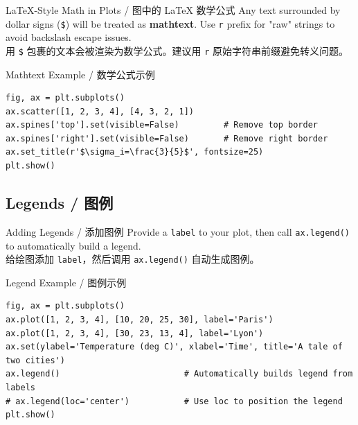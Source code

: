 \documentclass[11pt,a4paper]{report}
\let\oldtexttt\texttt
\renewcommand{\texttt}[1]{\textcolor{mainblue}{\oldtexttt{#1}}}
\begin{document}
\begin{concept}{LaTeX-Style Math in Plots / 图中的 LaTeX 数学公式}
    Any text surrounded by dollar signs (\texttt{\$}) will be treated as \textbf{mathtext}. Use \texttt{r} prefix for "raw" strings to avoid backslash escape issues. \\
    用 \texttt{\$} 包裹的文本会被渲染为数学公式。建议用 \texttt{r} 原始字符串前缀避免转义问题。
\end{concept}

\begin{examplebox}{Mathtext Example / 数学公式示例}
\begin{lstlisting}
fig, ax = plt.subplots()
ax.scatter([1, 2, 3, 4], [4, 3, 2, 1])
ax.spines['top'].set(visible=False)         # Remove top border
ax.spines['right'].set(visible=False)       # Remove right border
ax.set_title(r'$\sigma_i=\frac{3}{5}$', fontsize=25)
plt.show()
\end{lstlisting}
\end{examplebox}

\subsection{Legends / 图例}

\begin{concept}{Adding Legends / 添加图例}
    Provide a \texttt{label} to your plot, then call \texttt{ax.legend()} to automatically build a legend. \\
    给绘图添加 \texttt{label}，然后调用 \texttt{ax.legend()} 自动生成图例。
\end{concept}

\begin{examplebox}{Legend Example / 图例示例}
\begin{lstlisting}
fig, ax = plt.subplots()
ax.plot([1, 2, 3, 4], [10, 20, 25, 30], label='Paris')
ax.plot([1, 2, 3, 4], [30, 23, 13, 4], label='Lyon')
ax.set(ylabel='Temperature (deg C)', xlabel='Time', title='A tale of two cities')
ax.legend()                         # Automatically builds legend from labels
# ax.legend(loc='center')           # Use loc to position the legend
plt.show()
\end{lstlisting}
\end{examplebox}
\end{document}
